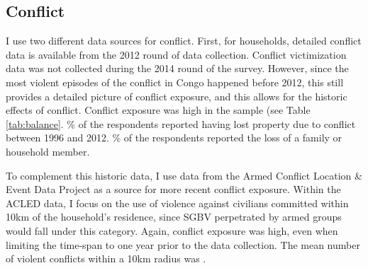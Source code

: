 \documentclass[10pt,a4paper]{scrartcl} %
\begin{document}
\subsection*{Conflict}
I use two different data sources for conflict. First, for  households, detailed conflict data is available from the 2012 round of data collection. Conflict victimization data was not collected during the 2014 round of the survey. However, since the most violent episodes of the conflict in Congo happened before 2012, this still provides a detailed picture of conflict exposure, and this allows for the historic effects of conflict. Conflict exposure was high in the sample (see Table \ref{tab:balance}. \% of the respondents reported having lost property due to conflict between 1996 and 2012.  \% of the respondents reported the loss of a family or household member.

To complement this historic data, I use data from the Armed Conflict Location \& Event Data Project \citep[ACLED;][]{Raleigh2010} as a source for more recent conflict exposure. Within the ACLED data, I focus on the use of violence against civilians committed within 10km of the household's residence, since SGBV perpetrated by armed groups would fall under this category. Again, conflict exposure was high, even when limiting the time-span to one year prior to the data collection. The mean number of violent conflicts within a 10km radius was . 
\end{document}
